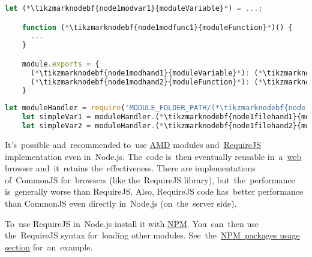\enlargethispage{20mm}
\thispagestyle{empty}
\begin{lstlisting}[language=JavaScript,title={Module file \mbit{\tikzmarknodebf{node1modfile}{moduleFile}.js}}]
    let (*\tikzmarknodebf{node1modvar1}{moduleVariable}*) = ...;

    function (*\tikzmarknodebf{node1modfunc1}{moduleFunction}*)() {
      ...
    }

    module.exports = {
      (*\tikzmarknodebf{node1modhand1}{moduleVariable}*): (*\tikzmarknodebf{node1modvar2}{moduleVariable}*),
      (*\tikzmarknodebf{node1modhand2}{moduleFunction}*): (*\tikzmarknodebf{node1modfunc2}{moduleFunction}*)
    }
\end{lstlisting}
\begin{lstlisting}[language=JavaScript,title={JavaScript executable file using the~module}]
    let moduleHandler = require('MODULE_FOLDER_PATH/(*\tikzmarknodebf{node1filefile}{moduleFile}[ForestGreen]*)');
    let simpleVar1 = moduleHandler.(*\tikzmarknodebf{node1filehand1}{moduleVariable}*); // Using module variable
    let simpleVar2 = moduleHandler.(*\tikzmarknodebf{node1filehand2}{moduleFunction}*)(); // Using module function
\end{lstlisting}
\newpage

\note It's~possible and~recommended to~use \hyperref[amd]{AMD} modules and~\hyperref[requrejs]{RequireJS} implementation even in~Node.js.
The~code is~then eventually reusable in~a~\hyperref[internetweb]{web} browser and~it~retains the~effectiveness.
There are implementations of~CommonJS for~browsers (like the~RequireJS library), but~the~performance is~generally worse than RequireJS.
Also, RequireJS code has~better performance than CommonJS even directly in~Node.js (on~the~server side).

To~use RequireJS in~Node.js install it with \hyperref[npm]{NPM}.
You~can~then use the~RequireJS syntax for~loading other modules.
See~the~\hyperref[npmpackageusage]{NPM~packages usage section} for~an~example.
